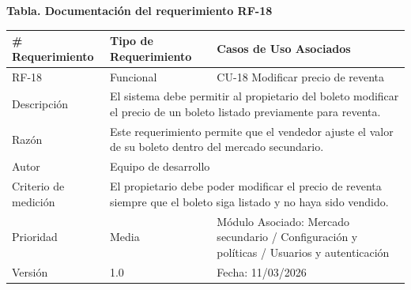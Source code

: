 \documentclass[12pt,letterpaper]{article}
\begin{document}
\noindent
\begin{minipage}{\textwidth}
\centering
\scriptsize
\renewcommand{\arraystretch}{0.9}
\setlength{\tabcolsep}{3pt}
\setlength{\arrayrulewidth}{0.5pt}

\textbf{Tabla. Documentación del requerimiento RF-18}

\vspace{2pt}

\begin{tabularx}{\textwidth}{|p{2.6cm}|X|p{3.4cm}|}
\hline
\# Requerimiento & Tipo de Requerimiento & Casos de Uso Asociados \\ \hline
RF-18 & Funcional & CU-18 Modificar precio de reventa \\ \hline
Descripción & \multicolumn{2}{X|}{El sistema debe permitir al propietario del boleto modificar el precio de un boleto listado previamente para reventa.} \\ \hline
Razón & \multicolumn{2}{X|}{Este requerimiento permite que el vendedor ajuste el valor de su boleto dentro del mercado secundario.} \\ \hline
Autor & \multicolumn{2}{X|}{Equipo de desarrollo} \\ \hline
Criterio de medición & \multicolumn{2}{X|}{El propietario debe poder modificar el precio de reventa siempre que el boleto siga listado y no haya sido vendido.} \\ \hline
Prioridad & Media & Módulo Asociado: Mercado secundario / Configuración y políticas / Usuarios y autenticación \\ \hline
Versión & 1.0 & Fecha: 11/03/2026 \\ \hline
\end{tabularx}
\end{minipage}

\vspace{0.2cm}
\end{document}
